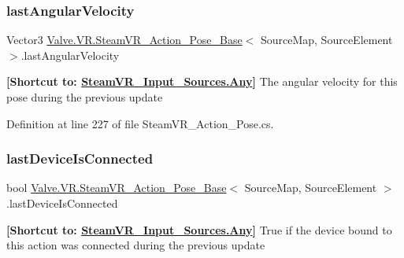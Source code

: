 \subsubsection{\texorpdfstring{lastAngularVelocity}{lastAngularVelocity}}
{\footnotesize\ttfamily Vector3 \mbox{\hyperlink{class_valve_1_1_v_r_1_1_steam_v_r___action___pose___base}{Valve.\+V\+R.\+Steam\+V\+R\+\_\+\+Action\+\_\+\+Pose\+\_\+\+Base}}$<$ Source\+Map, Source\+Element $>$.last\+Angular\+Velocity\hspace{0.3cm}{\ttfamily [get]}}



{\bfseries{\mbox{[}Shortcut to\+: \mbox{\hyperlink{namespace_valve_1_1_v_r_a82e5bf501cc3aa155444ee3f0662853faed36a1ef76a59ee3f15180e0441188ad}{Steam\+V\+R\+\_\+\+Input\+\_\+\+Sources.\+Any}}\mbox{]}}} The angular velocity for this pose during the previous update 



Definition at line 227 of file Steam\+V\+R\+\_\+\+Action\+\_\+\+Pose.\+cs.

\mbox{\label{class_valve_1_1_v_r_1_1_steam_v_r___action___pose___base_a879054dc94cfe2303fd3656be573af3f}} 
\subsubsection{\texorpdfstring{lastDeviceIsConnected}{lastDeviceIsConnected}}
{\footnotesize\ttfamily bool \mbox{\hyperlink{class_valve_1_1_v_r_1_1_steam_v_r___action___pose___base}{Valve.\+V\+R.\+Steam\+V\+R\+\_\+\+Action\+\_\+\+Pose\+\_\+\+Base}}$<$ Source\+Map, Source\+Element $>$.last\+Device\+Is\+Connected\hspace{0.3cm}{\ttfamily [get]}}



{\bfseries{\mbox{[}Shortcut to\+: \mbox{\hyperlink{namespace_valve_1_1_v_r_a82e5bf501cc3aa155444ee3f0662853faed36a1ef76a59ee3f15180e0441188ad}{Steam\+V\+R\+\_\+\+Input\+\_\+\+Sources.\+Any}}\mbox{]}}} True if the device bound to this action was connected during the previous update 



